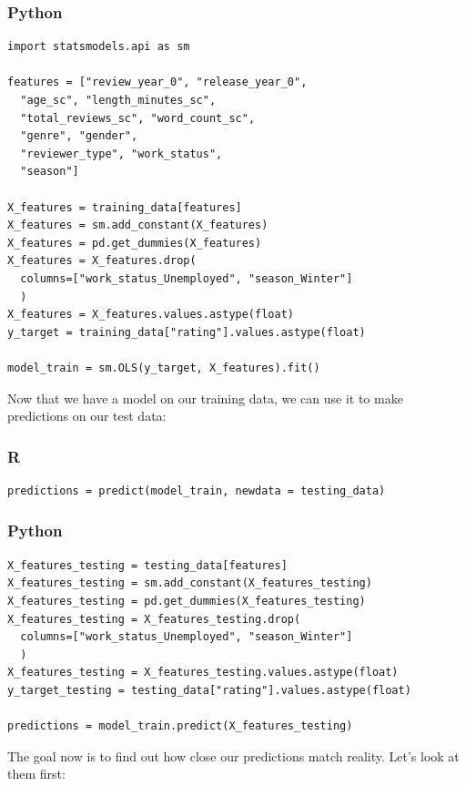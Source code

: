 \documentclass[
  letterpaper,
]{krantz}
\begin{document}
\subsubsection{Python}

\begin{verbatim}
import statsmodels.api as sm

features = ["review_year_0", "release_year_0",
  "age_sc", "length_minutes_sc", 
  "total_reviews_sc", "word_count_sc", 
  "genre", "gender", 
  "reviewer_type", "work_status", 
  "season"]

X_features = training_data[features]
X_features = sm.add_constant(X_features)
X_features = pd.get_dummies(X_features)
X_features = X_features.drop(
  columns=["work_status_Unemployed", "season_Winter"]
  )
X_features = X_features.values.astype(float)
y_target = training_data["rating"].values.astype(float)

model_train = sm.OLS(y_target, X_features).fit()
\end{verbatim}

Now that we have a model on our training data, we can use it to make
predictions on our test data:

\subsubsection{R}

\begin{verbatim}
predictions = predict(model_train, newdata = testing_data)
\end{verbatim}

\subsubsection{Python}

\begin{verbatim}
X_features_testing = testing_data[features]
X_features_testing = sm.add_constant(X_features_testing)
X_features_testing = pd.get_dummies(X_features_testing)
X_features_testing = X_features_testing.drop(
  columns=["work_status_Unemployed", "season_Winter"]
  )
X_features_testing = X_features_testing.values.astype(float)
y_target_testing = testing_data["rating"].values.astype(float)

predictions = model_train.predict(X_features_testing)
\end{verbatim}

The goal now is to find out how close our predictions match reality.
Let's look at them first:
\end{document}
